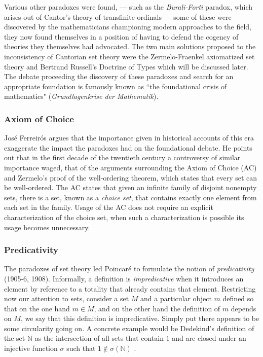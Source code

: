 \documentclass[12p]{article}
\newcommand{\NN}{\mathbb{N}}
\theoremstyle{definition}
\begin{document}
Various other paradoxes were found, --- such as the \textit{Burali-Forti} paradox, which arises out of Cantor's theory of transfinite ordinals --- some of these were discovered by the mathematicians championing modern approaches to the field, they now found themselves in a position of having to defend the cogency of theories they themselves had advocated. The two main solutions proposed to the inconsistency of Cantorian set theory were the Zermelo-Fraenkel axiomatized set theory and Bertrand Russell's Doctrine of Types which will be discussed later. The debate proceeding the discovery of these paradoxes and search for an appropriate foundation is famously known as  ``the foundational crisis of mathematics" (\textit{Grundlagenkrise der Mathematik}).
\subsubsection{Axiom of Choice}
José Ferreirós argues that the importance given in historical accounts of this era exaggerate the impact the paradoxes had on the foundational debate. He points out that in the first decade of the twentieth century a controversy of similar importance waged, that of the arguments surrounding the Axiom of Choice (AC) and Zermelo's proof of the well-ordering theorem, which states that every set can be well-ordered. The AC states that given an infinite family of disjoint nonempty sets, there is a set, known as a \textit{choice set}, that contains exactly one element from each set in the family. Usage of the AC does not require an explicit characterization of the choice set, when such a characterization is possible its usage becomes unnecessary.
\subsubsection{Predicativity}
The paradoxes of set theory led Poincaré to formulate the notion of \textit{predicativity} (1905-6, 1908). Informally, a definition is \textit{impredicative} when it introduces an element by reference to a totality that already contains that element.  Restricting now our attention to sets, consider a set $M$ and a particular object $m$ defined so that on the one hand $m \in M$, and on the other hand the definition of $m$ depends on $M$, we say that this definition is impredicative. Simply put there appears to be some circularity going on. A concrete example would be Dedekind's definition of the set $\NN$ as the intersection of all sets that contain $1$ and are closed under an injective function $\sigma$ such that $1 \notin \sigma(\NN)$ \cite{ferreirós_2001}\cite{kleene-meta}.
\end{document}
